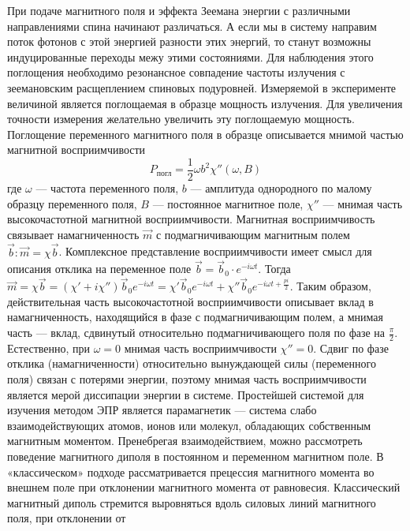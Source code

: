 \documentclass[a4paper,12pt]{article} %
\begin{document}
    При подаче магнитного поля и эффекта Зеемана энергии с различными направлениями спина начинают различаться. 
    А если мы в систему направим поток фотонов с этой энергией разности этих энергий, то станут возможны индуцированные переходы межу этими состояниями. 
    Для наблюдения этого поглощения необходимо резонансное совпадение частоты излучения с зеемановским расщеплением спиновых подуровней.
    Измеряемой в эксперименте величиной является поглощаемая в образце мощность излучения. 
    Для увеличения точности измерения желательно увеличить эту поглощаемую мощность.
    Поглощение переменного магнитного поля в образце описывается мнимой частью магнитной восприимчивости
    \begin{equation}
      P_{\text{погл}} = \frac{1}{2}\omega b^2 \chi''(\omega, B)
    \end{equation}
    где $\omega$ --- частота переменного поля, $b$ --- амплитуда однородного по малому образцу переменного поля, $B$ --- постоянное магнитное поле, $\chi''$ ---  мнимая часть высокочастотной магнитной восприимчивости. 
    Магнитная восприимчивость связывает намагниченность $\vec{m}$ с подмагничивающим магнитным полем $\vec{b} : \vec{m} =\chi \vec{b}$. 
    Комплексное представление восприимчивости имеет смысл для описания отклика на переменное поле $\vec{b}=\vec{b}_0 \cdot e^{-i \omega t}$. 
    Тогда $\vec{m} =\chi \vec{b} = (\chi' + i \chi'')\vec{b}_0 e^{-i \omega t}=\chi' \vec{b}_0 e^{-i \omega t} + \chi'' \vec{b}_0 e^{-i \omega t + \frac{pi}{2}}$. 
    Таким образом, действительная часть высокочастотной восприимчивости описывает вклад в намагниченность, находящийся в фазе с подмагничивающим полем, а мнимая часть — вклад, сдвинутый относительно подмагничивающего поля по фазе на $\frac{\pi}{2}$. 
    Естественно, при $\omega=0$ мнимая часть восприимчивости $\chi'' = 0$. 
    Сдвиг по фазе отклика (намагниченности) относительно вынуждающей силы (переменного поля) связан с потерями энергии, поэтому мнимая часть восприимчивости является мерой диссипации энергии в системе.
    Простейшей системой для изучения методом ЭПР является парамагнетик — система слабо взаимодействующих атомов, ионов или молекул, обладающих собственным магнитным моментом. 
    Пренебрегая взаимодействием, можно рассмотреть поведение магнитного диполя в постоянном и переменном магнитном поле. 
    В «классическом» подходе рассматривается прецессия магнитного момента во внешнем поле
    при отклонении магнитного момента от равновесия. Классический магнитный диполь
    стремится выровняться вдоль силовых линий магнитного поля, при отклонении от
\end{document}

